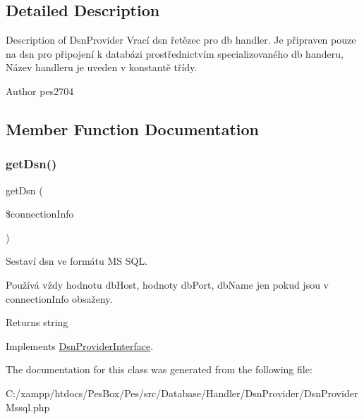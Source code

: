 \subsection{Detailed Description}
Description of Dsn\+Provider Vrací dsn řetězec pro db handler. Je připraven pouze na dsn pro připojení k databázi prostřednictvím specializovaného db handeru, Název handleru je uveden v konstantě třídy.

\begin{DoxyAuthor}{Author}
pes2704 
\end{DoxyAuthor}


\subsection{Member Function Documentation}
\mbox{\label{class_pes_1_1_database_1_1_handler_1_1_dsn_provider_1_1_dsn_provider_mssql_a7252e2f23ea50a5061fef81d06d6765a}} 
\subsubsection{\texorpdfstring{get\+Dsn()}{getDsn()}}
{\footnotesize\ttfamily get\+Dsn (\begin{DoxyParamCaption}\item[{\mbox{\hyperlink{interface_pes_1_1_database_1_1_handler_1_1_connection_info_interface}{Connection\+Info\+Interface}}}]{\$connection\+Info }\end{DoxyParamCaption})}

Sestaví dsn ve formátu MS S\+QL.

Používá vždy hodnotu db\+Host, hodnoty db\+Port, db\+Name jen pokud jsou v connection\+Info obsaženy.

\begin{DoxyReturn}{Returns}
string 
\end{DoxyReturn}


Implements \mbox{\hyperlink{interface_pes_1_1_database_1_1_handler_1_1_dsn_provider_1_1_dsn_provider_interface_a7252e2f23ea50a5061fef81d06d6765a}{Dsn\+Provider\+Interface}}.



The documentation for this class was generated from the following file\+:\begin{DoxyCompactItemize}
\item 
C\+:/xampp/htdocs/\+Pes\+Box/\+Pes/src/\+Database/\+Handler/\+Dsn\+Provider/Dsn\+Provider\+Mssql.\+php\end{DoxyCompactItemize}
